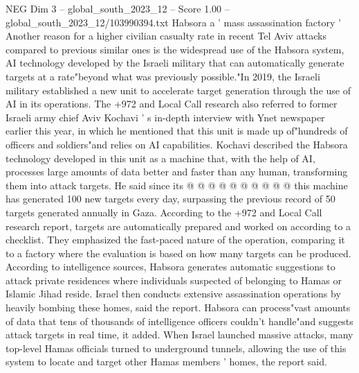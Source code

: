 \begin{textsample}{NEG Dim 3 – global\_south\_2023\_12 – Score 1.00 – global\_south\_2023\_12/103990394.txt}
Habsora a ' mass assassination factory ' Another reason for a higher civilian casualty rate in recent Tel Aviv attacks compared to previous similar ones is the widespread use of the Habsora system, AI technology developed by the Israeli military that can automatically generate targets at a rate"beyond what was previously possible."In 2019, the Israeli military established a new unit to accelerate target generation through the use of AI in its operations.
The +972 and Local Call research also referred to former Israeli army chief Aviv Kochavi ' s in-depth interview with Ynet newspaper earlier this year, in which he mentioned that this unit is made up of"hundreds of officers and soldiers"and relies on AI capabilities.
Kochavi described the Habsora technology developed in this unit as a machine that, with the help of AI, processes large amounts of data better and faster than any human, transforming them into attack targets.
He said since its @ @ @ @ @ @ @ @ @ @ this machine has generated 100 new targets every day, surpassing the previous record of 50 targets generated annually in Gaza.
According to the +972 and Local Call research report, targets are automatically prepared and worked on according to a checklist.
They emphasized the fast-paced nature of the operation, comparing it to a factory where the evaluation is based on how many targets can be produced.
According to intelligence sources, Habsora generates automatic suggestions to attack private residences where individuals suspected of belonging to Hamas or Islamic Jihad reside.
Israel then conducts extensive assassination operations by heavily bombing these homes, said the report.
Habsora can process"vast amounts of data that tens of thousands of intelligence officers couldn't handle"and suggests attack targets in real time, it added.
When Israel launched massive attacks, many top-level Hamas officials turned to underground tunnels, allowing the use of this system to locate and target other Hamas members ' homes, the report said.

\end{textsample}
